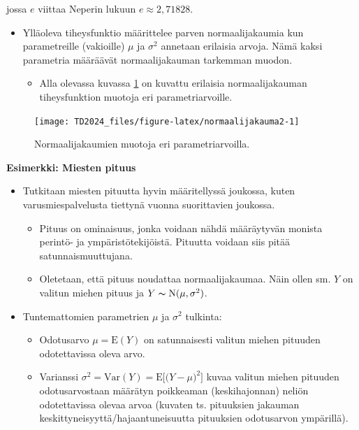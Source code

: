 \documentclass[
]{book}
\providecommand{\tightlist}{%
  \setlength{\itemsep}{0pt}\setlength{\parskip}{0pt}}
\begin{document}
jossa \(e\) viittaa Neperin lukuun \(e \approx 2,71828\).

\begin{itemize}
\tightlist
\item
  Ylläoleva tiheysfunktio määrittelee parven normaalijakaumia kun parametreille (vakioille) \(\mu\) ja \(\sigma^2\) annetaan erilaisia arvoja. Nämä kaksi parametria määräävät normaalijakauman tarkemman muodon.

  \begin{itemize}
  \tightlist
  \item
    Alla olevassa kuvassa \ref{fig:normaalijakauma2} on kuvattu erilaisia normaalijakauman tiheysfunktion muotoja eri parametriarvoille.
  \end{itemize}
\end{itemize}

\begin{figure}

{\centering \texttt{[image: TD2024\_files/figure-latex/normaalijakauma2-1]} 

}

\caption{Normaalijakaumien muotoja eri parametriarvoilla.}\label{fig:normaalijakauma2}
\end{figure}

\begin{eblock}{}

\textbf{Esimerkki: Miesten pituus}

\begin{itemize}
\tightlist
\item
  Tutkitaan miesten pituutta hyvin määritellyssä joukossa, kuten varusmiespalvelusta tiettynä vuonna suorittavien joukossa.

  \begin{itemize}
  \tightlist
  \item
    Pituus on ominaisuus, jonka voidaan nähdä määräytyvän monista perintö- ja ympäristötekijöistä. Pituutta voidaan siis pitää satunnaismuuttujana.
  \item
    Oletetaan, että pituus noudattaa normaalijakaumaa. Näin ollen sm. \(Y\) on valitun miehen pituus ja \(Y \thicksim \text{N}(\mu, \sigma^2)\).
  \end{itemize}
\item
  Tuntemattomien parametrien \(\mu\) ja \(\sigma^2\) tulkinta:

  \begin{itemize}
  \tightlist
  \item
    Odotusarvo \(\mu = \text{E}(Y)\) on satunnaisesti valitun miehen pituuden odotettavissa oleva arvo.
  \item
    Varianssi \(\sigma^2 = \mathrm{Var}(Y) = \text{E} \Big[\Big(Y- \mu \Big)^2 \Big]\) kuvaa valitun miehen pituuden odotusarvostaan määrätyn poikkeaman (keskihajonnan) neliön odotettavissa olevaa arvoa (kuvaten ts. pituuksien jakauman keskittyneisyyttä/hajaantuneisuutta pituuksien odotusarvon ympärillä).
  \end{itemize}
\end{itemize}

\end{eblock}
\end{document}
